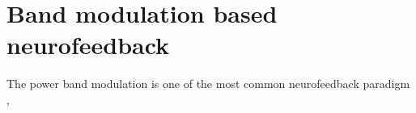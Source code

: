 \chapter{Band modulation based neurofeedback}\label{appendix:band}

The power band modulation is one of the most common neurofeedback paradigm \cite{jones2020infant, forsyth2018comparison, gruber2002modulation},  

